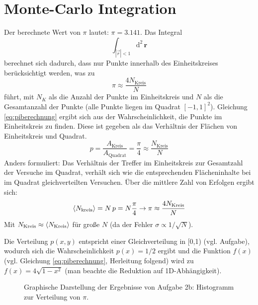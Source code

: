 \section*{Monte-Carlo Integration}
Der berechnete Wert von $\pi$ lautet: $\pi = 3.141$. Das Integral
\begin{equation}
\int_{|\vec{r}|<1} \mathup{d^2\,\textbf{r}}
\end{equation}
berechnet sich dadurch, dass nur Punkte innerhalb des Einheitskreises berücksichtigt werden, was zu 
\begin{equation}
\pi \approx \frac{4N_{\text{Kreis}}}{N}
\label{eq:piberechnung}
\end{equation} führt, mit $N_K$ als die Anzahl der Punkte im Einheitskreis und $N$ als die Gesamtanzahl der Punkte (alle Punkte liegen im Quadrat $[-1,1]^2$). 
Gleichung \ref{eq:piberechnung} ergibt sich aus der Wahrscheinlichkeit, die Punkte im Einheitskreis zu finden. Diese ist gegeben als das Verhältnis der Flächen von Einheitskreis und Quadrat.
\begin{equation}
p = \frac{A_{\text{Kreis}}}{A_{\text{Quadrat}}} = \frac{\pi}{4} \approx \frac{N_{\text{Kreis}}}{N}
\end{equation}
Anders formuliert: Das Verhältnis der Treffer im Einheitskreis zur Gesamtzahl der Versuche im Quadrat, verhält sich wie die entsprechenden Flächeninhalte bei im Quadrat gleichverteilten Versuchen.
Über die mittlere Zahl von Erfolgen ergibt sich:
\begin{equation}
\braket{N_{\text{kreis}}} = N\,p = N\frac{\pi}{4} \rightarrow \pi \approx \frac{4N_{\text{Kreis}}}{N}
\end{equation}
Mit $N_{\text{Kreis}} \approx \braket{N_{\text{Kreis}}}$ für große $N$ (da der Fehler $\sigma \propto 1/\sqrt{N}$).

Die Verteilung $p(x,y)$ entspricht einer Gleichverteilung in [0,1) (vgl. Aufgabe), wodurch sich die Wahrscheinlichkeit $p(x) = 1/2$ ergibt und die Funktion $f(x)$ (vgl. Gleichung \ref{eq:piberechnung}, Herleitung folgend) wird zu $f(x) = 4 \sqrt{1-x^2}$ (man beachte die Reduktion auf 1D-Abhängigkeit).
\begin{landscape}
	\begin{figure}
		\caption{Graphische Darstellung der Ergebnisse von Aufgabe 2b: Histogramm zur Verteilung von $\pi$.}
		\label{fig:2bhist}
	\end{figure}
\end{landscape}

